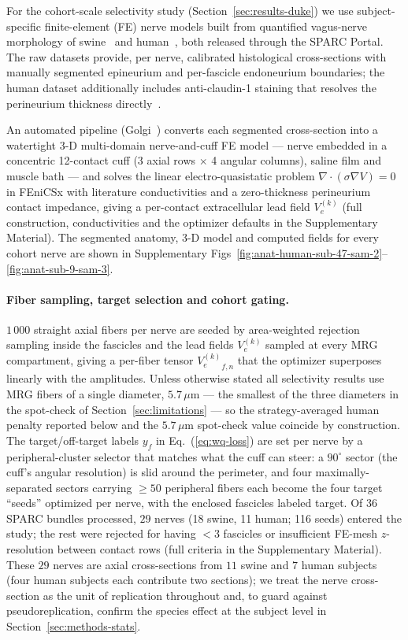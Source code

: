 For the cohort-scale selectivity study (Section~\ref{sec:results-duke})
we use subject-specific finite-element
(FE) nerve models built from quantified vagus-nerve morphology of
swine~\cite{pelot2020swineSPARC} and human~\cite{pelot2021humanSPARC},
both released through the SPARC Portal.  The raw datasets provide,
per nerve, calibrated histological cross-sections with manually
segmented epineurium and per-fascicle endoneurium boundaries; the
human dataset additionally includes anti-claudin-1 staining that
resolves the perineurium thickness directly~\cite{pelot2023humanvagus}.

An automated pipeline (Golgi~\cite{lung2026golgi}) converts each
segmented cross-section into a watertight 3-D multi-domain nerve-and-cuff
FE model --- nerve embedded in a concentric 12-contact cuff (3 axial
rows $\times$ 4 angular columns), saline film and muscle bath --- and
solves the linear electro-quasistatic problem
$\nabla \cdot (\sigma \nabla V) = 0$ in FEniCSx with literature
conductivities and a zero-thickness perineurium contact impedance,
giving a per-contact extracellular lead field $V_e^{(k)}$
(full construction, conductivities and the optimizer defaults in the
Supplementary Material).  The segmented anatomy, 3-D model and computed
fields for every cohort nerve are shown in Supplementary
Figs~\ref{fig:anat-human-sub-47-sam-2}--\ref{fig:anat-sub-9-sam-3}.

\paragraph{Fiber sampling, target selection and cohort gating.}
$1\,000$ straight axial fibers per nerve are seeded by area-weighted
rejection sampling inside the fascicles and the lead fields
$V_e^{(k)}$ sampled at every MRG compartment, giving a per-fiber tensor
${V_e^{(k)}}_{f,n}$ that the optimizer superposes linearly with the
amplitudes.  Unless otherwise stated all selectivity results use MRG
fibers of a single diameter, $5.7\,\mu$m --- the smallest of the three
diameters in the spot-check of Section~\ref{sec:limitations} --- so the
strategy-averaged human penalty reported below and the $5.7\,\mu$m
spot-check value coincide by construction.  The target/off-target labels $y_f$ in
Eq.~(\ref{eq:wq-loss}) are set per nerve by a peripheral-cluster
selector that matches what the cuff can steer: a $90^\circ$ sector (the
cuff's angular resolution) is slid around the perimeter, and four
maximally-separated sectors carrying $\ge\!50$ peripheral fibers each
become the four target ``seeds'' optimized per nerve, with the
enclosed fascicles labeled target.  Of $36$ SPARC bundles processed,
$29$ nerves (18 swine, 11 human; 116 seeds) entered the study; the rest
were rejected for having $<\!3$ fascicles or insufficient FE-mesh
$z$-resolution between contact rows (full criteria in the Supplementary
Material).  These $29$ nerves are axial cross-sections from
$11$ swine and $7$ human subjects (four human subjects each contribute
two sections); we treat the nerve cross-section as the unit of
replication throughout and, to guard against pseudoreplication,
confirm the species effect at the subject level in
Section~\ref{sec:methods-stats}.

